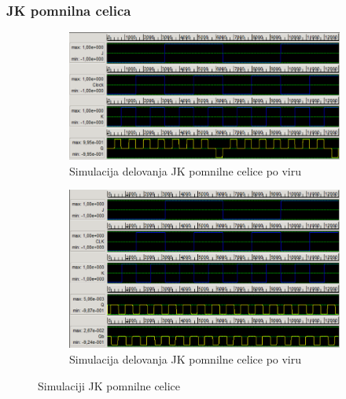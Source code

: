 \documentclass[a4paper, 11pt]{article}
\begin{document}
\subsubsection{JK pomnilna celica}
\begin{figure}[h!]
	\begin{subfigure}[b]{\textwidth}
	\includegraphics[width=\textwidth]{../img/vir_4/sim_jk.png}
	\caption{Simulacija delovanja JK pomnilne celice po viru \cite{quantum_dot}}
	\label{fig-jk-1-sim}
	\end{subfigure}
	\begin{subfigure}[b]{\textwidth}
	\includegraphics[width=\textwidth]{../img/vir_5/sim_jk.png}
	\caption{Simulacija delovanja JK pomnilne celice po viru \cite{a_novel_approach}}
	\label{fig-jk-2-sim}
	\end{subfigure}
	\caption{Simulaciji JK pomnilne celice}
	\label{fig-jk-sim}
\end{figure}
\end{document}

